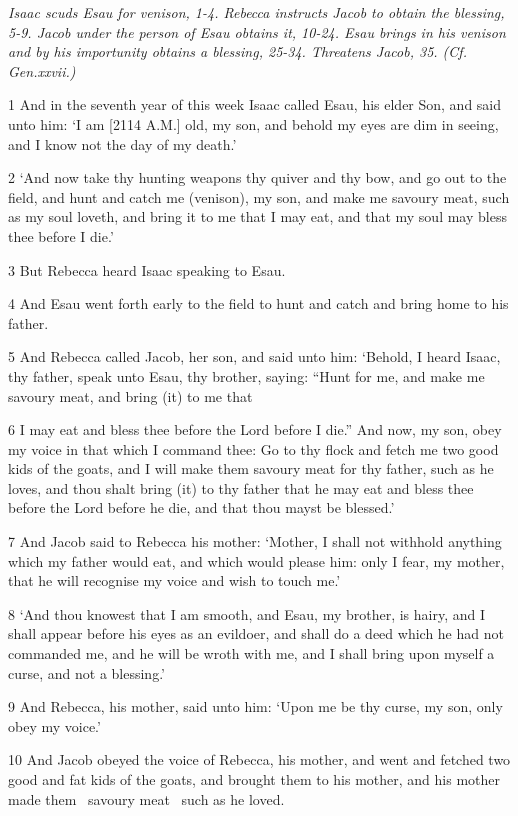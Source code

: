 \textit{Isaac scuds Esau for venison, 1-4. Rebecca instructs Jacob to obtain the blessing, 5-9. Jacob under the person of Esau obtains it, 10-24. Esau brings in his venison and by his importunity obtains a blessing, 25-34. Threatens Jacob, 35. (Cf. Gen.xxvii.)}

\par 1 And in the seventh year of this week Isaac called Esau, his elder Son, and said unto him: ‘I am [2114 A.M.] old, my son, and behold my eyes are dim in seeing, and I know not the day of my death.’
\par 2 ‘And now take thy hunting weapons thy quiver and thy bow, and go out to the field, and hunt and catch me (venison), my son, and make me savoury meat, such as my soul loveth, and bring it to me that I may eat, and that my soul may bless thee before I die.’
\par 3 But Rebecca heard Isaac speaking to Esau.
\par 4 And Esau went forth early to the field to hunt and catch and bring home to his father.
\par 5 And Rebecca called Jacob, her son, and said unto him: ‘Behold, I heard Isaac, thy father, speak unto Esau, thy brother, saying: “Hunt for me, and make me savoury meat, and bring (it) to me that
\par 6 I may eat and bless thee before the Lord before I die.” And now, my son, obey my voice in that which I command thee: Go to thy flock and fetch me two good kids of the goats, and I will make them savoury meat for thy father, such as he loves, and thou shalt bring (it) to thy father that he may eat and bless thee before the Lord before he die, and that thou mayst be blessed.’
\par 7 And Jacob said to Rebecca his mother: ‘Mother, I shall not withhold anything which my father would eat, and which would please him: only I fear, my mother, that he will recognise my voice and wish to touch me.’
\par 8 ‘And thou knowest that I am smooth, and Esau, my brother, is hairy, and I shall appear before his eyes as an evildoer, and shall do a deed which he had not commanded me, and he will be wroth with me, and I shall bring upon myself a curse, and not a blessing.’
\par 9 And Rebecca, his mother, said unto him: ‘Upon me be thy curse, my son, only obey my voice.’
\par 10 And Jacob obeyed the voice of Rebecca, his mother, and went and fetched two good and fat kids of the goats, and brought them to his mother, and his mother made them ~savoury meat~ such as he loved.
